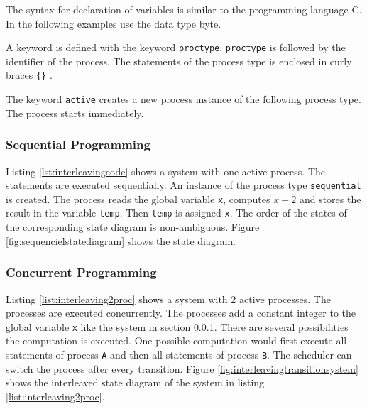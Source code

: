 \documentclass[a4paper, twoside]{article}
\begin{document}
The syntax for declaration of variables is similar to the programming language C. In the following examples use the data type byte.

A keyword is defined with the keyword \verb|proctype|. \verb|proctype| is followed by the identifier of the process. The statements of the process type is enclosed in curly braces \verb|{}| \cite{holzmann03}.

The keyword \verb|active| creates a new process instance of the following process type. The process starts immediately.

\subsubsection{Sequential Programming}
\label{sec:sequential}

Listing \ref{lst:interleavingcode} shows a system with one active process. The statements are executed sequentially. An instance of the process type \verb|sequential| is created. The process reads the global variable \verb|x|, computes $x+2$ and stores the result in the variable \verb|temp|. Then \verb|temp| is assigned \verb|x|. The order of the states of the corresponding state diagram is non-ambiguous. Figure \ref{fig:sequencielstatediagram} shows the state diagram.

   

\subsubsection{Concurrent Programming}
\label{sec:concurrent}

Listing \ref{list:interleaving2proc} shows a system with 2 active processes. The processes are executed concurrently. The processes add a constant integer to the global variable \verb|x| like the system in section \ref{sec:sequential}. There are several possibilities the computation is executed. One possible computation would first execute all statements of process \verb|A| and then all statements of process \verb|B|. The scheduler can switch the process after every transition. Figure \ref{fig:interleavingtransitionsystem} shows the interleaved state diagram of the system in listing \ref{list:interleaving2proc}.

    
\end{document}
